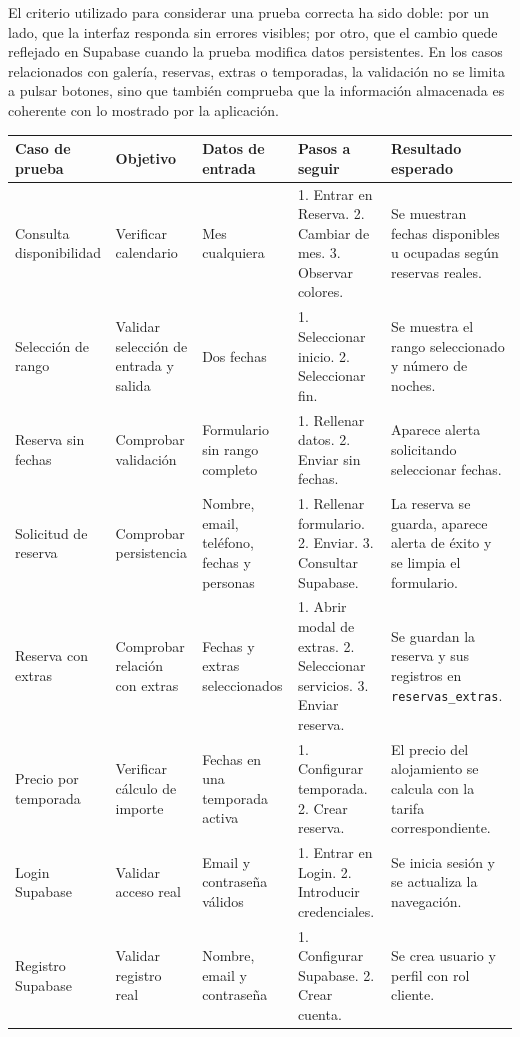 \documentclass[11pt,a4paper]{article}
\begin{document}
El criterio utilizado para considerar una prueba correcta ha sido doble: por un lado, que la interfaz responda sin errores visibles; por otro, que el cambio quede reflejado en Supabase cuando la prueba modifica datos persistentes. En los casos relacionados con galería, reservas, extras o temporadas, la validación no se limita a pulsar botones, sino que también comprueba que la información almacenada es coherente con lo mostrado por la aplicación.

\begin{table}[H]
\centering
\small
\begin{tabularx}{\textwidth}{|p{2.8cm}|p{2.7cm}|p{3.2cm}|p{2.9cm}|p{3.1cm}|}
\hline
\textbf{Caso de prueba} & \textbf{Objetivo} & \textbf{Datos de entrada} & \textbf{Pasos a seguir} & \textbf{Resultado esperado} \\
\hline
Consulta disponibilidad & Verificar calendario & Mes cualquiera & 1. Entrar en Reserva. 2. Cambiar de mes. 3. Observar colores. & Se muestran fechas disponibles u ocupadas según reservas reales. \\
\hline
Selección de rango & Validar selección de entrada y salida & Dos fechas & 1. Seleccionar inicio. 2. Seleccionar fin. & Se muestra el rango seleccionado y número de noches. \\
\hline
Reserva sin fechas & Comprobar validación & Formulario sin rango completo & 1. Rellenar datos. 2. Enviar sin fechas. & Aparece alerta solicitando seleccionar fechas. \\
\hline
Solicitud de reserva & Comprobar persistencia & Nombre, email, teléfono, fechas y personas & 1. Rellenar formulario. 2. Enviar. 3. Consultar Supabase. & La reserva se guarda, aparece alerta de éxito y se limpia el formulario. \\
\hline
Reserva con extras & Comprobar relación con extras & Fechas y extras seleccionados & 1. Abrir modal de extras. 2. Seleccionar servicios. 3. Enviar reserva. & Se guardan la reserva y sus registros en \texttt{reservas\_extras}. \\
\hline
Precio por temporada & Verificar cálculo de importe & Fechas en una temporada activa & 1. Configurar temporada. 2. Crear reserva. & El precio del alojamiento se calcula con la tarifa correspondiente. \\
\hline
Login Supabase & Validar acceso real & Email y contraseña válidos & 1. Entrar en Login. 2. Introducir credenciales. & Se inicia sesión y se actualiza la navegación. \\
\hline
Registro Supabase & Validar registro real & Nombre, email y contraseña & 1. Configurar Supabase. 2. Crear cuenta. & Se crea usuario y perfil con rol cliente. \\

\end{tabularx}
\end{table}
\end{document}

